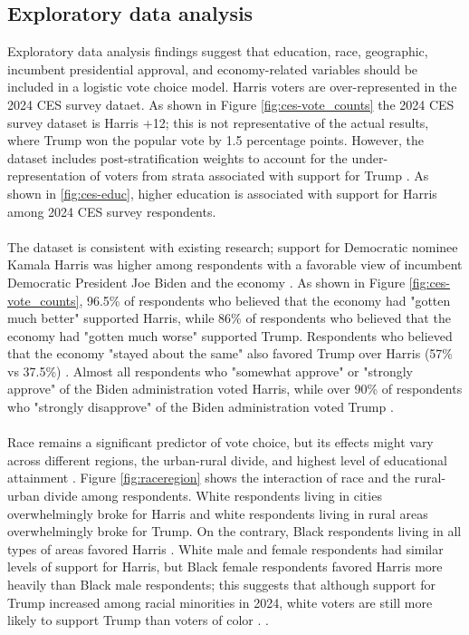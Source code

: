 \documentclass[letter]{article}
\begin{document}
\subsection{Exploratory data analysis}
Exploratory data analysis findings suggest that education, race, geographic, incumbent presidential approval, and economy-related variables should be included in a logistic vote choice model. Harris voters are over-represented in the 2024 CES survey dataet. As shown in Figure \ref{fig:ces-vote_counts} the 2024 CES survey dataset is Harris +12; this is not representative of the actual results, where Trump won the popular vote by 1.5 percentage points. However, the dataset includes post-stratification weights to account for the under-representation of voters from strata associated with support for Trump \cite{ces24}. As shown in \ref{fig:ces-educ}, higher education is associated with support for Harris among 2024 CES survey respondents. \\
\\
The dataset is consistent with existing research; support for Democratic nominee Kamala Harris was higher among respondents with a favorable view of incumbent Democratic President Joe Biden and the economy \cite{algara} \cite{camatarri} \cite{ces24}. As shown in Figure \ref{fig:ces-vote_counts}, 96.5\% of respondents who believed that the economy had "gotten much better" supported Harris, while 86\% of respondents who believed that the economy had "gotten much worse" supported Trump. Respondents who believed that the economy "stayed about the same" also favored Trump over Harris (57\% vs 37.5\%) \cite{ces24}.  Almost all respondents who "somewhat approve" or "strongly approve" of the Biden administration voted Harris, while over 90\% of respondents who "strongly disapprove" of the Biden administration voted Trump \cite{algara} \cite{ces24}. \\
\\
Race remains a significant predictor of vote choice, but its effects might vary across different regions, the urban-rural divide, and highest level of educational attainment \cite{kuriwaki}. Figure \ref{fig:raceregion} shows the interaction of race and the rural-urban divide among respondents.  White respondents living in cities overwhelmingly broke for Harris and white respondents living in rural areas overwhelmingly broke for Trump. On the contrary, Black respondents living in all types of areas favored Harris \cite{ces24}. White male and female respondents had similar levels of support for Harris, but Black female respondents favored Harris more heavily than Black male respondents; this suggests that although support for Trump increased among racial minorities in 2024, white voters are still more likely to support Trump than voters of color \cite{camatarri} \cite{pew}. \cite{ces24}.
\end{document}
